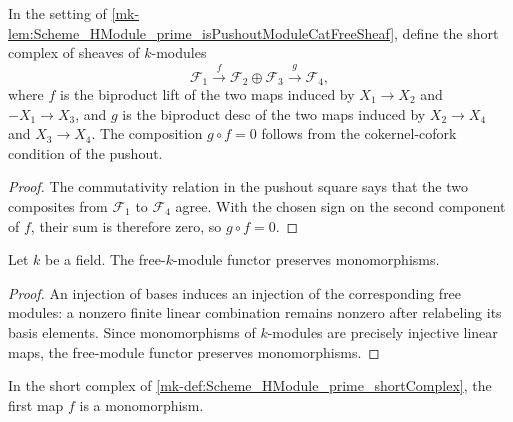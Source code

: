 \begin{definition}\label{mk-def:Scheme_HModule_prime_shortComplex}
  \leanok


  In the setting of \ref{mk-lem:Scheme_HModule_prime_isPushoutModuleCatFreeSheaf}, define the short complex of sheaves of \(k\)-modules
  \[
    \mathcal F_1 \xrightarrow{\;f\;} \mathcal F_2 \oplus \mathcal F_3 \xrightarrow{\;g\;} \mathcal F_4,
  \]
  where \(f\) is the biproduct lift of the two maps induced by \(X_1 \to X_2\) and \(-X_1 \to X_3\), and \(g\) is the biproduct desc of the two maps induced by \(X_2 \to X_4\) and \(X_3 \to X_4\). The composition \(g \circ f = 0\) follows from the cokernel-cofork condition of the pushout.
\end{definition}

\begin{proof}
  \leanok

  The commutativity relation in the pushout square says that the two composites from \(\mathcal F_1\) to \(\mathcal F_4\) agree. With the chosen sign on the second component of \(f\), their sum is therefore zero, so \(g\circ f=0\).
\end{proof}

\begin{definition}\label{mk-def:Scheme_ModuleCat_free_preservesMonomorphisms}
  \leanok

  Let \(k\) be a field. The free-\(k\)-module functor preserves monomorphisms.
\end{definition}

\begin{proof}
  \leanok
  An injection of bases induces an injection of the corresponding free modules: a nonzero finite linear combination remains nonzero after relabeling its basis elements. Since monomorphisms of \(k\)-modules are precisely injective linear maps, the free-module functor preserves monomorphisms.
\end{proof}

\begin{lemma}\label{mk-lem:Scheme_HModule_prime_shortComplex_f_mono}
  \leanok


  In the short complex of \ref{mk-def:Scheme_HModule_prime_shortComplex}, the first map \(f\) is a monomorphism.
\end{lemma}

